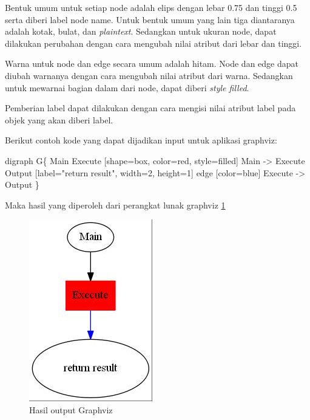 Bentuk umum untuk setiap node adalah elips dengan lebar 0.75 dan tinggi 0.5 serta diberi label node name. Untuk bentuk umum yang lain tiga diantaranya adalah kotak, bulat, dan \textsl{plaintext}. Sedangkan untuk ukuran node, dapat dilakukan perubahan dengan cara mengubah nilai atribut dari lebar dan tinggi.

Warna untuk node dan edge secara umum adalah hitam. Node dan edge dapat diubah warnanya dengan cara mengubah nilai atribut dari warna. Sedangkan untuk mewarnai bagian dalam dari node, dapat diberi \textsl{style filled}.

Pemberian label dapat dilakukan dengan cara mengisi nilai atribut label pada objek yang akan diberi label.

Berikut contoh kode yang dapat dijadikan input untuk aplikasi graphviz:

\begin{algorithmic}[1]
	\STATE digraph G\{
	\STATE 		Main
	\STATE		Execute [shape=box, color=red, style=filled]
	\STATE		Main -> Execute
	\STATE		Output [label="return result", width=2, height=1]
	\STATE    edge [color=blue]
	\STATE		Execute -> Output
	\STATE \}
\end{algorithmic}

Maka hasil yang diperoleh dari perangkat lunak graphviz \ref{fig:outGraphviz}

\begin{figure}[H]
\centering
\includegraphics[scale=0.9]{Gambar/Graphviz.jpg}
\caption[Hasil output Graphviz]{Hasil output Graphviz} 
\label{fig:outGraphviz}
\end{figure}












